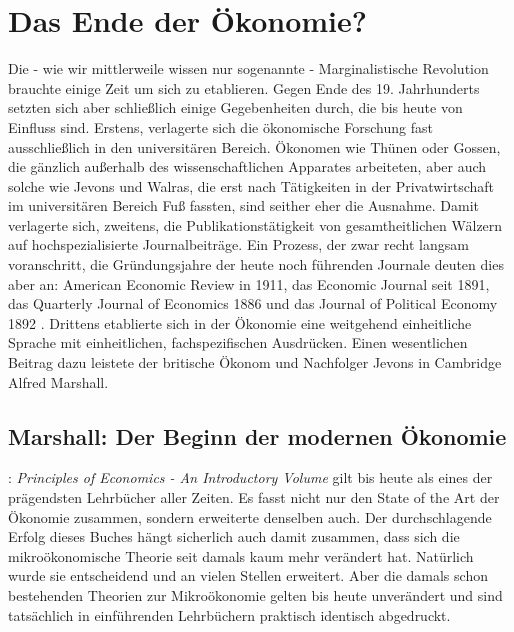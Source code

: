 %
%
%

\chapter{Das Ende der Ökonomie?}
\label{Neoklassik}

Die - wie wir mittlerweile wissen nur sogenannte - Marginalistische Revolution brauchte einige Zeit um sich zu etablieren. Gegen Ende des 19. Jahrhunderts setzten sich aber schließlich einige Gegebenheiten durch, die bis heute von Einfluss sind. Erstens, verlagerte sich die ökonomische Forschung fast ausschließlich in den universitären Bereich. Ökonomen wie Thünen oder Gossen, die gänzlich außerhalb des wissenschaftlichen Apparates arbeiteten, aber auch solche wie Jevons und Walras, die erst nach Tätigkeiten in der Privatwirtschaft im universitären Bereich Fuß fassten, sind seither eher die Ausnahme. Damit verlagerte sich, zweitens, die Publikationstätigkeit von gesamtheitlichen Wälzern auf hochspezialisierte Journalbeiträge. Ein Prozess, der zwar recht langsam voranschritt, die Gründungsjahre der heute noch führenden Journale deuten dies aber an: American Economic Review in 1911, das Economic Journal seit 1891, das Quarterly Journal of Economics 1886 und das Journal of Political Economy 1892 \parencite[S. 340]{Rosner2012}.
Drittens etablierte sich in der Ökonomie eine weitgehend einheitliche Sprache mit einheitlichen, fachspezifischen Ausdrücken. Einen wesentlichen Beitrag dazu leistete der britische Ökonom und Nachfolger Jevons in Cambridge Alfred Marshall.

\section{Marshall: Der Beginn der modernen Ökonomie}

\textcite{Marshall1890}: \textit{Principles of Economics - An Introductory Volume} gilt bis heute als eines der prägendsten Lehrbücher aller Zeiten. Es fasst nicht nur den State of the Art der Ökonomie zusammen, sondern erweiterte denselben auch. Der durchschlagende Erfolg dieses Buches hängt sicherlich auch damit zusammen, dass sich die mikroökonomische Theorie seit damals kaum mehr verändert hat. Natürlich wurde sie entscheidend und an vielen Stellen erweitert. Aber die damals schon bestehenden Theorien zur Mikroökonomie gelten bis heute unverändert und sind tatsächlich in einführenden Lehrbüchern praktisch identisch abgedruckt.

